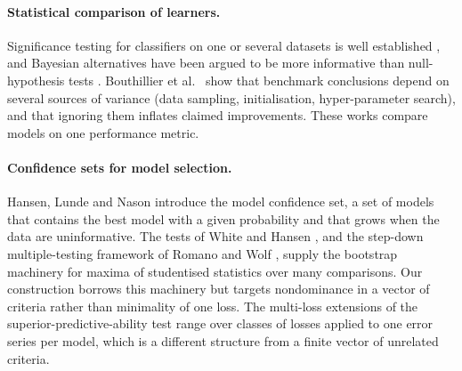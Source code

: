 \documentclass[pdflatex,sn-mathphys-num,iicol]{sn-jnl}
\theoremstyle{thmstyleone}
\theoremstyle{thmstyletwo}
\begin{document}
\paragraph{Statistical comparison of learners.} Significance testing for classifiers on one or several datasets is well established \cite{dietterich1998,demsar2006}, and Bayesian alternatives have been argued to be more informative than null-hypothesis tests \cite{benavoli2017}. Bouthillier et al.\ \cite{bouthillier2021} show that benchmark conclusions depend on several sources of variance (data sampling, initialisation, hyper-parameter search), and that ignoring them inflates claimed improvements. These works compare models on one performance metric.

\paragraph{Confidence sets for model selection.} Hansen, Lunde and Nason \cite{hansen2011mcs} introduce the model confidence set, a set of models that contains the best model with a given probability and that grows when the data are uninformative. The tests of White \cite{white2000} and Hansen \cite{hansen2005spa}, and the step-down multiple-testing framework of Romano and Wolf \cite{romano2005}, supply the bootstrap machinery for maxima of studentised statistics over many comparisons. Our construction borrows this machinery but targets nondominance in a vector of criteria rather than minimality of one loss. The multi-loss extensions of the superior-predictive-ability test \cite{arvanitis2021,jin2017} range over classes of losses applied to one error series per model, which is a different structure from a finite vector of unrelated criteria.
\end{document}
